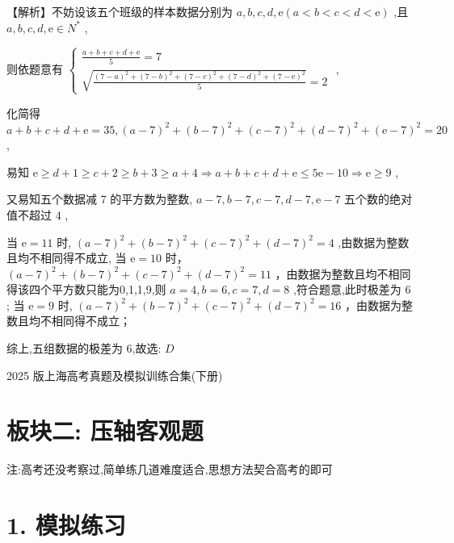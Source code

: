 \documentclass[10pt]{article}
\begin{document}
【解析】不妨设该五个班级的样本数据分别为 \(a,b,c,d,\mathrm{e}\left( {a < b < c < d < \mathrm{e}}\right)\) ,且 \(a,b,c,d,\mathrm{e} \in  {N}^{ * }\) ,

则依题意有 \(\left\{  \begin{array}{l} \frac{a + b + c + d + \mathrm{e}}{5} = 7 \\  \sqrt{\frac{{\left( 7 - a\right) }^{2} + {\left( 7 - b\right) }^{2} + {\left( 7 - c\right) }^{2} + {\left( 7 - d\right) }^{2} + {\left( 7 - \mathrm{e}\right) }^{2}}{5}} = 2 \end{array}\right.\) ,

化简得 \(a + b + c + d + \mathrm{e} = {35},{\left( a - 7\right) }^{2} + {\left( b - 7\right) }^{2} + {\left( c - 7\right) }^{2} + {\left( d - 7\right) }^{2} + {\left( \mathrm{e} - 7\right) }^{2} = {20}\) ,

易知 \(\mathrm{e} \geq  d + 1 \geq  c + 2 \geq  b + 3 \geq  a + 4 \Rightarrow  a + b + c + d + \mathrm{e} \leq  5\mathrm{e} - {10} \Rightarrow  \mathrm{e} \geq  9\) ,

又易知五个数据减 7 的平方数为整数, \(a - 7,b - 7,c - 7,d - 7,\mathrm{e} - 7\) 五个数的绝对值不超过 4 ,

当 \(\mathrm{e} = {11}\) 时, \({\left( a - 7\right) }^{2} + {\left( b - 7\right) }^{2} + {\left( c - 7\right) }^{2} + {\left( d - 7\right) }^{2} = 4\) ,由数据为整数且均不相同得不成立, 当 \(\mathrm{e} = {10}\) 时， \({\left( a - 7\right) }^{2} + {\left( b - 7\right) }^{2} + {\left( c - 7\right) }^{2} + {\left( d - 7\right) }^{2} = {11}\) ，由数据为整数且均不相同得该四个平方数只能为0,1,1,9,则 \(a = 4,b = 6,c = 7,d = 8\) ,符合题意,此时极差为 6 ; 当 \(\mathrm{e} = 9\) 时, \({\left( a - 7\right) }^{2} + {\left( b - 7\right) }^{2} + {\left( c - 7\right) }^{2} + {\left( d - 7\right) }^{2} = {16}\) ，由数据为整数且均不相同得不成立；

综上,五组数据的极差为 6,故选: \(D\)

2025 版上海高考真题及模拟训练合集(下册)

\section*{板块二: 压轴客观题}

注:高考还没考察过,简单练几道难度适合,思想方法契合高考的即可

\section*{1. 模拟练习}
\end{document}
